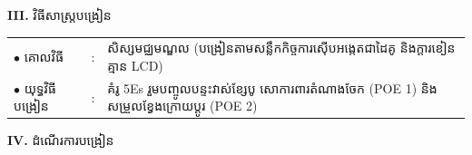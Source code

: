 \documentclass[a4paper,10pt]{article}
\newcommand{\en}[1]{{\TimesEn #1}}
\begin{document}
{\vspace{2pt}

\textbf{III.} {\muol វិធីសាស្រ្តបង្រៀន}\\[1pt]
\hspace*{0.45cm}%
\begin{tabular}{@{}l l L{14.85cm}@{}}
  $\bullet$ \hspace{0.25cm} គោលវិធី & : & សិស្សមជ្ឈមណ្ឌល (បង្រៀនតាមសន្លឹកកិច្ចការស៊ើបអង្កេតជាដៃគូ និងក្ដារខៀន គ្មាន \en{LCD}) \\
  $\bullet$ \hspace{0.25cm} យុទ្ធវិធីបង្រៀន & : & គំរូ \en{5Es} រួមបញ្ចូលបន្ទះវាស់ខ្សែបូ សោការពារតំណាងចែក \en{(POE 1)} និងសម្រួលខ្វែងក្រោយប្ដូរ \en{(POE 2)} \\
\end{tabular}
}

\vspace{2pt}

\textbf{IV.} {\muol ដំណើរការបង្រៀន}

\vspace{1pt}
\end{document}
